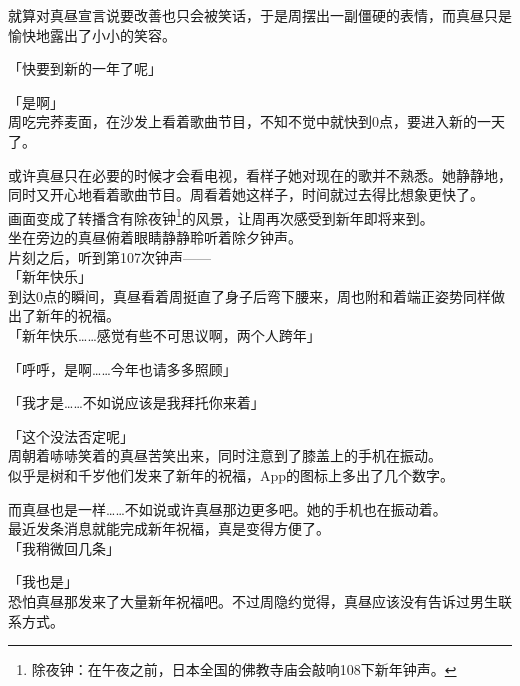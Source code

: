 就算对真昼宣言说要改善也只会被笑话，于是周摆出一副僵硬的表情，而真昼只是愉快地露出了小小的笑容。\\

\vspace{2\baselineskip}

「快要到新的一年了呢」

「是啊」\\

周吃完荞麦面，在沙发上看着歌曲节目，不知不觉中就快到0点，要进入新的一天了。

或许真昼只在必要的时候才会看电视，看样子她对现在的歌并不熟悉。她静静地，同时又开心地看着歌曲节目。周看着她这样子，时间就过去得比想象更快了。\\

画面变成了转播含有除夜钟\footnote{除夜钟：在午夜之前，日本全国的佛教寺庙会敲响108下新年钟声。}的风景，让周再次感受到新年即将来到。\\

坐在旁边的真昼俯着眼睛静静聆听着除夕钟声。\\

片刻之后，听到第107次钟声——\\

「新年快乐」\\

到达0点的瞬间，真昼看着周挺直了身子后弯下腰来，周也附和着端正姿势同样做出了新年的祝福。\\

「新年快乐……感觉有些不可思议啊，两个人跨年」

「呼呼，是啊……今年也请多多照顾」

「我才是……不如说应该是我拜托你来着」

「这个没法否定呢」\\

周朝着哧哧笑着的真昼苦笑出来，同时注意到了膝盖上的手机在振动。\\

似乎是树和千岁他们发来了新年的祝福，App的图标上多出了几个数字。

而真昼也是一样……不如说或许真昼那边更多吧。她的手机也在振动着。\\

最近发条消息就能完成新年祝福，真是变得方便了。\\

「我稍微回几条」

「我也是」\\

恐怕真昼那发来了大量新年祝福吧。不过周隐约觉得，真昼应该没有告诉过男生联系方式。\\

